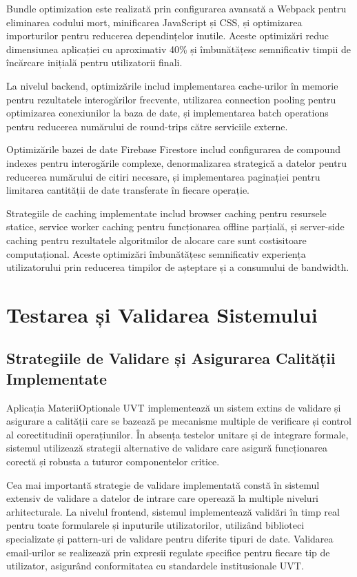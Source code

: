 \documentclass[12pt,a4paper]{report}
\begin{document}
Bundle optimization este realizată prin configurarea avansată a Webpack \cite{webpack} pentru eliminarea codului mort, minificarea JavaScript și CSS, și optimizarea importurilor pentru reducerea dependințelor inutile. Aceste optimizări reduc dimensiunea aplicației cu aproximativ 40\% și îmbunătățesc semnificativ timpii de încărcare inițială pentru utilizatorii finali.

La nivelul backend, optimizările includ implementarea cache-urilor în memorie pentru rezultatele interogărilor frecvente, utilizarea connection pooling pentru optimizarea conexiunilor la baza de date, și implementarea batch operations pentru reducerea numărului de round-trips către serviciile externe.

Optimizările bazei de date Firebase Firestore \cite{firestore} includ configurarea de compound indexes pentru interogările complexe, denormalizarea strategică a datelor pentru reducerea numărului de citiri necesare, și implementarea paginației pentru limitarea cantității de date transferate în fiecare operație.

Strategiile de caching implementate includ browser caching pentru resursele statice, service worker caching pentru funcționarea offline parțială, și server-side caching pentru rezultatele algoritmilor de alocare care sunt costisitoare computațional. Aceste optimizări îmbunătățesc semnificativ experiența utilizatorului prin reducerea timpilor de așteptare și a consumului de bandwidth.

\chapter{Testarea și Validarea Sistemului}

\section{Strategiile de Validare și Asigurarea Calității Implementate}

Aplicația MateriiOptionale UVT implementează un sistem extins de validare și asigurare a calității care se bazează pe mecanisme multiple de verificare și control al corectitudinii operațiunilor. În absența testelor unitare și de integrare formale, sistemul utilizează strategii alternative de validare care asigură funcționarea corectă și robusta a tuturor componentelor critice.

Cea mai importantă strategie de validare implementată constă în sistemul extensiv de validare a datelor de intrare care operează la multiple niveluri arhitecturale. La nivelul frontend, sistemul implementează validări în timp real pentru toate formularele și inputurile utilizatorilor, utilizând biblioteci specializate și pattern-uri de validare pentru diferite tipuri de date. Validarea email-urilor se realizează prin expresii regulate specifice pentru fiecare tip de utilizator, asigurând conformitatea cu standardele institusionale UVT.
\end{document}
